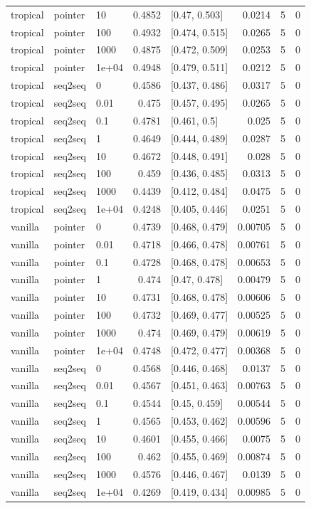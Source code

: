 \documentclass[10pt]{article}
\begin{document}
{\begin{longtable}{lllrlrrr}
tropical & pointer & 10 & 0.4852 & [0.47, 0.503] & 0.0214 & 5 & 0\\
tropical & pointer & 100 & 0.4932 & [0.474, 0.515] & 0.0265 & 5 & 0\\
tropical & pointer & 1000 & 0.4875 & [0.472, 0.509] & 0.0253 & 5 & 0\\
tropical & pointer & 1e+04 & 0.4948 & [0.479, 0.511] & 0.0212 & 5 & 0\\
tropical & seq2seq & 0 & 0.4586 & [0.437, 0.486] & 0.0317 & 5 & 0\\
tropical & seq2seq & 0.01 & 0.475 & [0.457, 0.495] & 0.0265 & 5 & 0\\
tropical & seq2seq & 0.1 & 0.4781 & [0.461, 0.5] & 0.025 & 5 & 0\\
tropical & seq2seq & 1 & 0.4649 & [0.444, 0.489] & 0.0287 & 5 & 0\\
tropical & seq2seq & 10 & 0.4672 & [0.448, 0.491] & 0.028 & 5 & 0\\
tropical & seq2seq & 100 & 0.459 & [0.436, 0.485] & 0.0313 & 5 & 0\\
tropical & seq2seq & 1000 & 0.4439 & [0.412, 0.484] & 0.0475 & 5 & 0\\
tropical & seq2seq & 1e+04 & 0.4248 & [0.405, 0.446] & 0.0251 & 5 & 0\\
vanilla & pointer & 0 & 0.4739 & [0.468, 0.479] & 0.00705 & 5 & 0\\
vanilla & pointer & 0.01 & 0.4718 & [0.466, 0.478] & 0.00761 & 5 & 0\\
vanilla & pointer & 0.1 & 0.4728 & [0.468, 0.478] & 0.00653 & 5 & 0\\
vanilla & pointer & 1 & 0.474 & [0.47, 0.478] & 0.00479 & 5 & 0\\
vanilla & pointer & 10 & 0.4731 & [0.468, 0.478] & 0.00606 & 5 & 0\\
vanilla & pointer & 100 & 0.4732 & [0.469, 0.477] & 0.00525 & 5 & 0\\
vanilla & pointer & 1000 & 0.474 & [0.469, 0.479] & 0.00619 & 5 & 0\\
vanilla & pointer & 1e+04 & 0.4748 & [0.472, 0.477] & 0.00368 & 5 & 0\\
vanilla & seq2seq & 0 & 0.4568 & [0.446, 0.468] & 0.0137 & 5 & 0\\
vanilla & seq2seq & 0.01 & 0.4567 & [0.451, 0.463] & 0.00763 & 5 & 0\\
vanilla & seq2seq & 0.1 & 0.4544 & [0.45, 0.459] & 0.00544 & 5 & 0\\
vanilla & seq2seq & 1 & 0.4565 & [0.453, 0.462] & 0.00596 & 5 & 0\\
vanilla & seq2seq & 10 & 0.4601 & [0.455, 0.466] & 0.0075 & 5 & 0\\
vanilla & seq2seq & 100 & 0.462 & [0.455, 0.469] & 0.00874 & 5 & 0\\
vanilla & seq2seq & 1000 & 0.4576 & [0.446, 0.467] & 0.0139 & 5 & 0\\
vanilla & seq2seq & 1e+04 & 0.4269 & [0.419, 0.434] & 0.00985 & 5 & 0\\
\bottomrule
\end{longtable}
}
\end{document}
